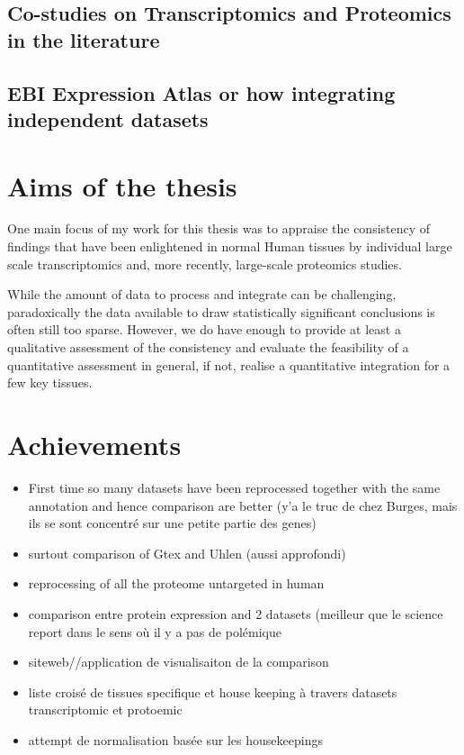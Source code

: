 \subsection{Co-studies on Transcriptomics and Proteomics in the literature}
\subsection{EBI Expression Atlas or how integrating independent datasets }


\section{Aims of the thesis}

One main focus of my work for this thesis was to appraise the
consistency of findings that have been enlightened in normal Human tissues by
individual large scale transcriptomics and, more recently, large-scale
proteomics studies.

While the amount of data to process and integrate can be challenging,
paradoxically the data available to draw statistically significant conclusions
is often still too sparse. However, we do have enough to provide at least a
qualitative assessment of the consistency and evaluate the feasibility of a
quantitative assessment in general, if not, realise a quantitative integration
for a few key tissues.

\section{Achievements}
\begin{itemize}
    \item First time so many datasets have been reprocessed together with the
        same annotation and hence comparison are better (y'a le truc de chez Burges,
        mais ils se sont concentré sur une petite partie des genes)
    \item surtout comparison of Gtex and Uhlen (aussi approfondi)
    \item reprocessing of all the proteome untargeted in human
    \item comparison entre protein expression and 2 datasets (meilleur que le
        science report dans le sens où il y a pas de polémique
    \item siteweb//application de visualisaiton de la comparison
    \item liste croisé de tissues specifique et house keeping à travers datasets
        transcriptomic et protoemic
    \item attempt de normalisation basée sur les housekeepings
\end{itemize}


